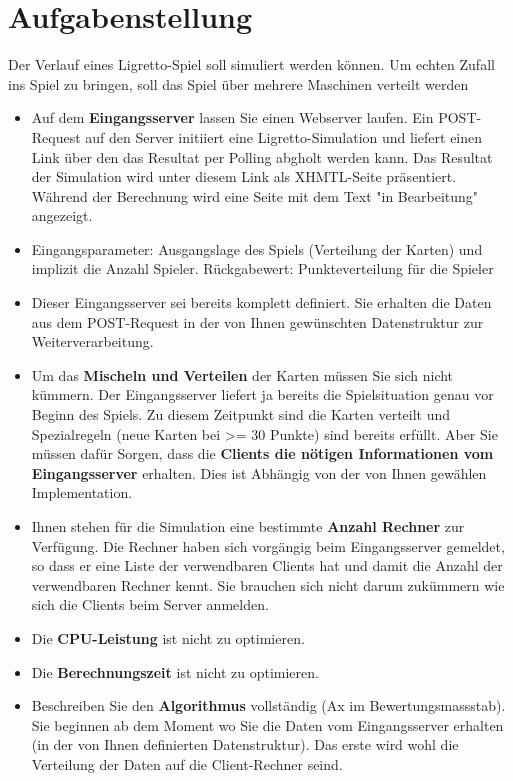 \section{Aufgabenstellung} 

Der Verlauf eines Ligretto-Spiel soll simuliert werden können. Um echten Zufall ins Spiel zu bringen, soll das Spiel über mehrere Maschinen verteilt werden

 \begin{itemize}
 \item Auf dem \textbf{Eingangsserver} lassen Sie einen Webserver laufen. Ein POST-Request auf den Server initiiert eine Ligretto-Simulation und liefert einen Link über den das Resultat per Polling abgholt werden kann. Das Resultat der Simulation wird  unter diesem Link als XHMTL-Seite präsentiert. Während der Berechnung wird eine Seite mit dem Text "in Bearbeitung" angezeigt.
 \item Eingangsparameter: Ausgangslage des Spiels (Verteilung der Karten) und implizit die Anzahl Spieler. Rückgabewert: Punkteverteilung für die Spieler
 \item Dieser Eingangsserver sei bereits komplett definiert. Sie erhalten die Daten aus dem POST-Request in der von Ihnen gewünschten Datenstruktur zur Weiterverarbeitung.
 \item Um das \textbf{Mischeln und Verteilen} der Karten müssen Sie sich nicht kümmern. Der Eingangsserver liefert ja bereits die Spielsituation genau vor Beginn des Spiels. Zu diesem Zeitpunkt sind die Karten verteilt und Spezialregeln (neue Karten bei >= 30 Punkte) sind bereits erfüllt. Aber Sie müssen dafür Sorgen, dass die \textbf{Clients die nötigen Informationen vom Eingangsserver} erhalten. Dies ist Abhängig von der von Ihnen gewählen Implementation.
 \item Ihnen stehen für die Simulation eine bestimmte \textbf{Anzahl Rechner} zur Verfügung. Die Rechner haben sich vorgängig beim Eingangsserver gemeldet, so dass er eine Liste der verwendbaren Clients hat und damit die Anzahl der verwendbaren Rechner kennt. Sie brauchen sich nicht darum zukümmern wie sich die Clients beim Server anmelden.
 \item Die \textbf{CPU-Leistung} ist nicht zu optimieren.
 \item Die \textbf{Berechnungszeit} ist  nicht zu optimieren.
 \item Beschreiben Sie den \textbf{Algorithmus} vollständig (Ax im Bewertungsmassstab). Sie beginnen ab dem Moment wo Sie die Daten vom Eingangsserver erhalten (in der von Ihnen definierten Datenstruktur). Das erste wird wohl die Verteilung der Daten auf die Client-Rechner seind.

\end{itemize}
